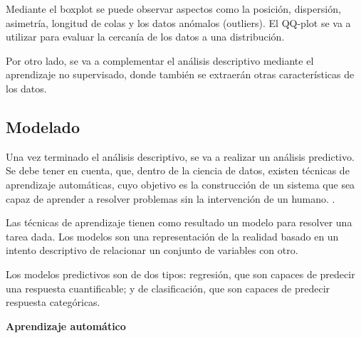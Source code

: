 Mediante el boxplot se puede observar aspectos como la posición, dispersión, asimetría, longitud de colas y los datos anómalos (outliers). 
El QQ-plot se va a utilizar para evaluar la cercanía de los datos a una distribución. \cite{Orellana2001}

Por otro lado, se va a complementar el análisis descriptivo mediante el aprendizaje no supervisado, donde también se extraerán otras características de los datos.



\subsection{Modelado}
Una vez terminado el análisis descriptivo, se va a realizar un análisis predictivo. Se debe tener en cuenta, que, dentro de la ciencia de datos, existen técnicas de aprendizaje automáticas, cuyo objetivo es la construcción de un sistema que sea capaz de aprender a resolver problemas sin la intervención de un humano. \cite{MARIN2018}.

Las técnicas de aprendizaje tienen como resultado un modelo para resolver una tarea dada. Los modelos son una representación de la realidad basado en un intento descriptivo de relacionar un conjunto de variables con otro.

Los modelos predictivos son de dos tipos: regresión, que son capaces de predecir una respuesta cuantificable; y de clasificación, que son capaces de predecir respuesta categóricas.

\textbf{Aprendizaje automático}

